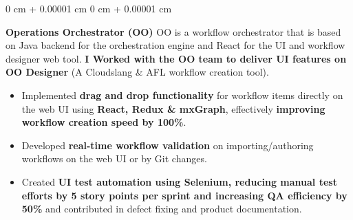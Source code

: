 \documentclass[10pt, letterpaper]{article}
\newenvironment{highlights}{
    \begin{itemize}[
        topsep=0.10 cm,
        parsep=0.10 cm,
        partopsep=0pt,
        itemsep=0pt,
        leftmargin=0 cm + 10pt
    ]
}{
    \end{itemize}
} %
\newenvironment{onecolentry}{
    \begin{adjustwidth}{
        0 cm + 0.00001 cm
    }{
        0 cm + 0.00001 cm
    }
}{
    \end{adjustwidth}
} %
\begin{document}
        \vspace{0.20 cm}
        \begin{onecolentry}
            \textbf{Operations Orchestrator (OO)}
            \newline OO is a workflow orchestrator that is based on Java backend for the orchestration engine and React for the UI and workflow designer web tool. \textbf{I Worked with the OO team to deliver UI features on OO Designer} (A Cloudslang \& AFL workflow creation tool).
            \begin{highlights}
                \item Implemented \textbf{drag and drop functionality} for workflow items directly on the web UI using \textbf{React, Redux \& mxGraph}, effectively \textbf{improving workflow creation speed by 100\%}.
                \item Developed \textbf{real-time workflow validation} on importing/authoring workflows on the web UI or by Git changes.
                \item Created \textbf{UI test automation using Selenium, reducing manual test efforts by 5 story points per sprint and increasing QA efficiency by 50\%} and contributed in defect fixing and product documentation.
            \end{highlights}
        \end{onecolentry}


        \vspace{0.5 cm}
\end{document}

